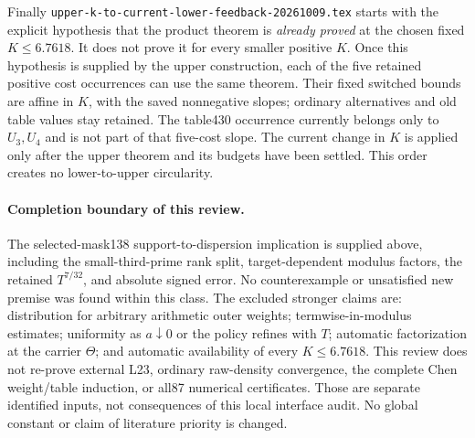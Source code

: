Finally \texttt{upper-k-to-current-lower-feedback-20261009.tex}
starts with the explicit hypothesis that the product theorem is
\emph{already proved} at the chosen fixed $K\le6.7618$. It does
not prove it for every smaller positive $K$. Once this hypothesis
is supplied by the upper construction, each of the five retained
positive cost occurrences can use the same theorem. Their fixed
switched bounds are affine in $K$, with the saved nonnegative
slopes; ordinary alternatives and old table values stay retained.
The table430 occurrence currently belongs only to $U_3,U_4$ and
is not part of that five-cost slope. The current change in $K$
is applied only after the upper theorem and its budgets have been
settled. This order creates no lower-to-upper circularity.

\paragraph{Completion boundary of this review.}
The selected-mask138 support-to-dispersion implication is supplied
above, including the small-third-prime rank split, target-dependent
modulus factors, the retained $T^{7/32}$, and absolute signed error.
No counterexample or unsatisfied new premise was found within
this class. The excluded stronger claims are: distribution for
arbitrary arithmetic outer weights; termwise-in-modulus estimates;
uniformity as $a\downarrow0$ or the policy refines with $T$;
automatic factorization at the carrier $\Theta$; and automatic
availability of every $K\le6.7618$. This review does not re-prove
external L23, ordinary raw-density convergence, the complete Chen
weight/table induction, or all87 numerical certificates. Those
are separate identified inputs, not consequences of this local
interface audit. No global constant or claim of literature priority
is changed.
